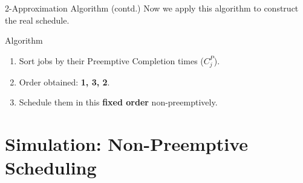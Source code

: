 \documentclass[aspectratio=169, 12pt]{beamer}
\begin{document}
\begin{frame}{2-Approximation Algorithm (contd.)}
    Now we apply this algorithm to construct the real schedule.
    
    \vspace{0.5cm}
    \begin{block}{Algorithm}
    \begin{enumerate}
        \item<1-> Sort jobs by their Preemptive Completion times ($C_j^P$).
        \item<2-> Order obtained: \textbf{1, 3, 2}.
        \item<3-> Schedule them in this \textbf{fixed order} non-preemptively.
    \end{enumerate}
    \end{block}
\end{frame}

\section{Simulation: Non-Preemptive Scheduling}
\end{document}
